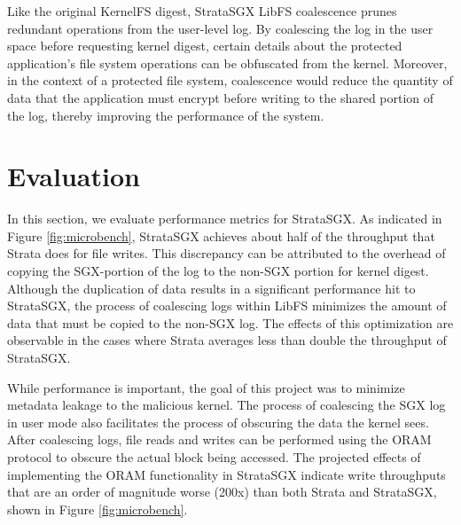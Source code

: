 \documentclass[letterpaper,twocolumn,10pt]{article}
\begin{document}
Like the original KernelFS digest, StrataSGX LibFS coalescence prunes redundant 
operations from the user-level log. By coalescing the log in the user space
before requesting kernel digest, certain details about the protected
application's file system operations can be obfuscated from the kernel.
Moreover, in the context of a protected file system, coalescence would reduce the
quantity of data that the application must encrypt before writing to the shared
portion of the log, thereby improving the performance of the system.


\section{Evaluation} \label{eval}

In this section, we evaluate performance metrics for StrataSGX. %
As indicated in Figure \ref{fig:microbench}, StrataSGX achieves about %
half of the throughput that Strata does for file writes. This discrepancy can be 
attributed to the overhead of copying the SGX-portion of the log to the non-SGX 
portion for kernel digest. Although the duplication of data results in a 
significant performance hit to StrataSGX, the process of coalescing logs within 
LibFS minimizes the amount of data that must be copied to the non-SGX log. 
The effects of this optimization are observable in the cases where Strata averages 
less than double the throughput of StrataSGX.

While performance is important, the 
goal of this project was to minimize metadata leakage to the malicious kernel. The 
process of coalescing the SGX log in user mode also facilitates the process of 
obscuring the data the kernel sees. After coalescing logs, file reads and
writes can be performed using the ORAM protocol to obscure the actual block
being accessed. The projected effects of implementing the ORAM functionality in
StrataSGX indicate write throughputs that are an order of magnitude worse
(200x) than both Strata and StrataSGX, shown in Figure \ref{fig:microbench}.
\end{document}
